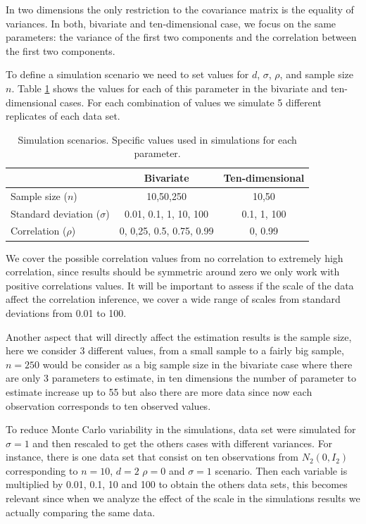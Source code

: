 \documentclass{article}
\begin{document}
In two dimensions the only restriction to the covariance matrix is the equality of variances. In both, bivariate and ten-dimensional case, we focus on the same parameters: the variance of the first two components and the correlation between the first two components. 

To define a simulation scenario we need to set values for $d$, $\sigma$, $\rho$, and sample size $n$. Table \ref{scen} shows the values for each of this parameter in the bivariate and ten-dimensional cases. For each combination of values we simulate 5 different replicates of each data set.  

\begin{table}[htbp]
   \centering
   \caption{Simulation scenarios. Specific values used in simulations for each parameter. \label{scen}} 
     \begin{tabular}{lcc} \hline
          &  Bivariate    & Ten-dimensional  \\ \hline
      Sample size   ($n$)   & 10,50,250   &  10,50  \\
      Standard deviation ($\sigma$)  & 0.01, 0.1, 1, 10, 100 & 0.1, 1, 100 \\
      Correlation ($\rho$)   &  0, 0,25, 0.5, 0.75, 0.99  &  0, 0.99 \\ \hline
   \end{tabular}
\end{table}

We cover the possible correlation values from no correlation to extremely high correlation, since results should be symmetric around zero we only work with positive correlations values. It will be important to assess if the scale of the data affect the correlation inference, we cover a wide range of scales from standard deviations from 0.01 to 100. 

Another aspect that will directly affect the estimation results is the sample size, here we consider 3 different values, from a small sample to a fairly big sample, $n=250$ would be consider as a big sample size in the bivariate case where there are only 3 parameters to estimate, in ten dimensions the number of parameter to estimate increase up to 55 but also there are more data since now each observation corresponds to ten observed values. 

To reduce Monte Carlo variability in the simulations, data set were simulated for $\sigma=1$ and then rescaled to get the others cases with different variances. For instance, there is one data set that consist on ten observations from $N_2(0, I_2 )$ corresponding to $n=10$, $d=2$ $\rho=0$ and $\sigma=1$ scenario. Then each variable is multiplied by 0.01, 0.1, 10  and 100 to obtain the others data sets, this becomes relevant since when we analyze the effect of the scale in the simulations results we actually comparing the same data. 
\end{document}
